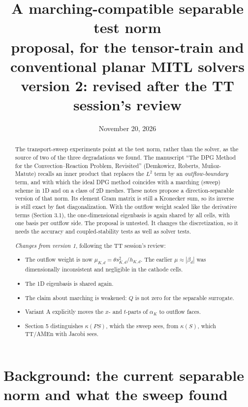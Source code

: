 \documentclass[11pt]{article}
\title{A marching-compatible separable test norm\\[2pt]\large proposal, for the tensor-train and conventional planar MITL solvers\\[2pt]
\normalsize version 2: revised after the TT session's review}
\author{}
\date{November 20, 2026}
\theoremstyle{remark}
\begin{document}
\maketitle

\begin{abstract}
The transport-sweep experiments point at the test norm, rather than the solver, as the source of two of the three
degradations we found.  The manuscript ``The DPG Method for the Convection--Reaction Problem, Revisited''
(Demkowicz, Roberts, Mu\~noz-Matute) recalls an inner product that replaces the $L^2$ term by an \emph{outflow-boundary}
term, and with which the ideal DPG method coincides with a marching (sweep) scheme in 1D and on a class of 2D meshes.
These notes propose a direction-separable version of that norm.  Its element Gram matrix is still a Kronecker sum, so
its inverse is still exact by fast diagonalization.  With the outflow weight scaled like the derivative terms
(Section 3.1), the one-dimensional eigenbasis is again shared by all cells, with one basis per outflow side.  The
proposal is untested.  It changes the discretization, so it needs the accuracy and coupled-stability tests as well as
solver tests.

\emph{Changes from version 1}, following the TT session's review:
\begin{itemize}[nosep]
  \item The outflow weight is now $\mu_{K,d}=\theta s_{K,d}^2/h_{K,d}$.  The earlier $\mu\approx|\beta_d|$ was
        dimensionally inconsistent and negligible in the cathode cells.
  \item The 1D eigenbasis is shared again.
  \item The claim about marching is weakened: $Q$ is not zero for the separable surrogate.
  \item Variant A explicitly moves the $x$- and $t$-parts of $\alpha_K$ to outflow faces.
  \item Section 5 distinguishes $\kappa(PS)$, which the sweep sees, from $\kappa(S)$, which TT/AMEn with Jacobi sees.
\end{itemize}
\end{abstract}

\section{Background: the current separable norm and what the sweep found}
\end{document}
